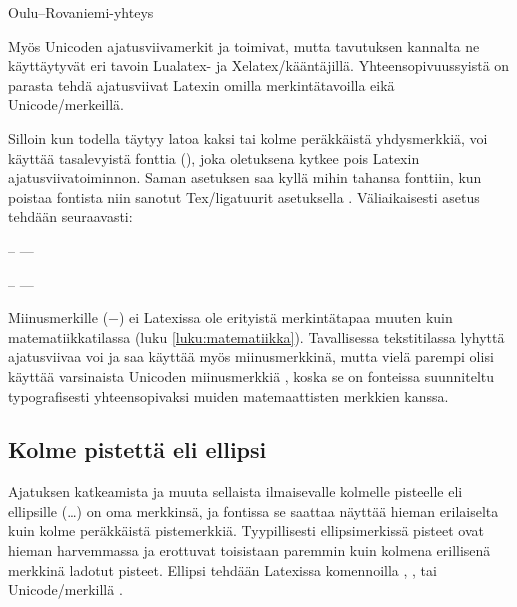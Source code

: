 \begin{tulossis}
  Oulu--Rovaniemi-yhteys
\end{tulossis}

Myös Unicoden ajatusviivamerkit  ja
 toimivat, mutta tavutuksen kannalta ne
käyttäytyvät eri tavoin Lua\-latex- ja Xelatex\-/kääntäjillä.
Yhteensopivuussyistä on parasta tehdä ajatusviivat Latexin omilla
merkintätavoilla eikä Unicode\-/merkeillä.

Silloin kun todella täytyy latoa kaksi tai kolme peräkkäistä
yhdysmerkkiä, voi käyttää tasalevyistä fonttia (), joka oletuksena kytkee pois Latexin
ajatusviivatoiminnon. Saman asetuksen saa kyllä mihin tahansa fonttiin,
kun poistaa fontista niin sanotut Tex\-/ligatuurit asetuksella
. Väliaikaisesti asetus tehdään
seuraavasti:


\begin{koodilohkosis}
  { -- ---}
\end{koodilohkosis}

\begin{tulossis}
  { -- ---}
\end{tulossis}

Miinusmerkille (−) ei Latexissa ole erityistä merkintätapaa muuten kuin
matematiikkatilassa (luku \ref{luku:matematiikka}). Tavallisessa
tekstitilassa lyhyttä ajatusviivaa voi ja saa käyttää myös
miinusmerkkinä, mutta vielä parempi olisi käyttää varsinaista Unicoden
miinusmerkkiä , koska se on fonteissa
suunniteltu typografisesti yhteensopivaksi muiden matemaattisten
merkkien kanssa.

\subsection{Kolme pistettä eli ellipsi}

Ajatuksen katkeamista ja muuta sellaista ilmaisevalle kolmelle pisteelle
eli ellipsille (\ldots) on oma merkkinsä, ja fontissa se saattaa näyttää
hieman erilaiselta kuin kolme peräkkäistä pistemerkkiä. Tyypillisesti
ellipsimerkissä pisteet ovat hieman harvemmassa ja erottuvat toisistaan
paremmin kuin kolmena erillisenä merkkinä ladotut pisteet. Ellipsi
tehdään Latexissa komennoilla , ,
 tai Unicode\-/merkillä .

